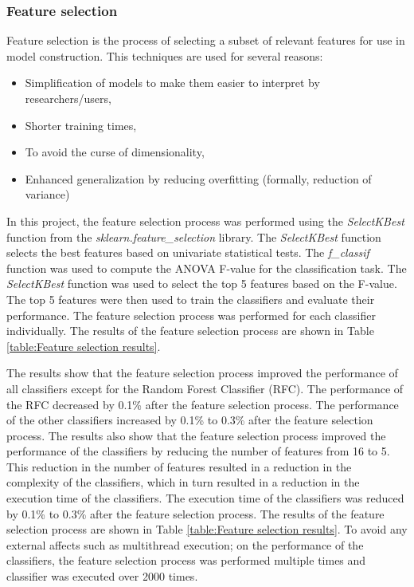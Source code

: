 \documentclass[conference,onecolumn]{IEEEtran}
\begin{document}
    \subsubsection{Feature selection}
        Feature selection is the process of selecting a subset of relevant features for use in model construction. This techniques are used for several reasons:
        \begin{itemize}
            \item Simplification of models to make them easier to interpret by researchers/users,
            \item Shorter training times,
            \item To avoid the curse of dimensionality,
            \item Enhanced generalization by reducing overfitting (formally, reduction of variance)
        \end{itemize}

        In this project, the feature selection process was performed using the \emph{SelectKBest} function from the \emph{sklearn.feature\_selection} library. The \emph{SelectKBest} function selects the best features based on univariate statistical tests. The \emph{f\_classif} function was used to compute the ANOVA F-value for the classification task. The \emph{SelectKBest} function was used to select the top 5 features based on the F-value. The top 5 features were then used to train the classifiers and evaluate their performance. The feature selection process was performed for each classifier individually. The results of the feature selection process are shown in Table \ref{table:Feature selection results}. 
        
        The results show that the feature selection process improved the performance of all classifiers except for the Random Forest Classifier (RFC). The performance of the RFC decreased by 0.1\% after the feature selection process. The performance of the other classifiers increased by 0.1\% to 0.3\% after the feature selection process. The results also show that the feature selection process improved the performance of the classifiers by reducing the number of features from 16 to 5. This reduction in the number of features resulted in a reduction in the complexity of the classifiers, which in turn resulted in a reduction in the execution time of the classifiers. The execution time of the classifiers was reduced by 0.1\% to 0.3\% after the feature selection process. The results of the feature selection process are shown in Table \ref{table:Feature selection results}. To avoid any external affects such as multithread execution; on the performance of the classifiers, the feature selection process was performed multiple times and classifier was executed over 2000 times.
\end{document}
